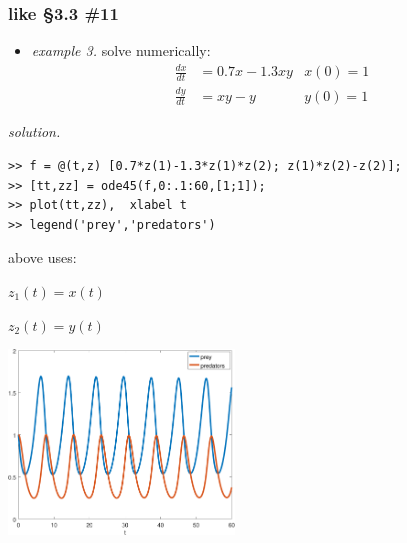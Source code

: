 \documentclass[urlcolor=blue,dvipsnames]{beamer}
\begin{document}
\begin{frame}[fragile]
\frametitle{like \S3.3 \#11}

\begin{itemize}
\item \emph{example 3.}  solve numerically:
\begin{align*}
\frac{dx}{dt} &= 0.7 x - 1.3 xy & x(0)=1\\
\frac{dy}{dt} &= xy - y  & y(0)=1
\end{align*}
\end{itemize}

\vspace{-2mm}
\noindent \emph{solution.}
\begin{Verbatim}[fontsize=\small]
>> f = @(t,z) [0.7*z(1)-1.3*z(1)*z(2); z(1)*z(2)-z(2)];
>> [tt,zz] = ode45(f,0:.1:60,[1;1]);
>> plot(tt,zz),  xlabel t
>> legend('prey','predators')
\end{Verbatim}

\bigskip
above uses:

$z_1(t)=x(t)$

$z_2(t)=y(t)$

\vspace{-22mm}
\hfill \includegraphics[width=0.45\textwidth]{figs/lotka-time}
\end{frame}
\end{document}
